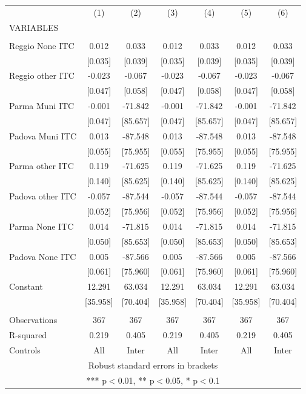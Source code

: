 \begin{tabular}{lcccccc} \hline
 & (1) & (2) & (3) & (4) & (5) & (6) \\
VARIABLES &  &  &  &  &  &  \\ \hline
 &  &  &  &  &  &  \\
Reggio None ITC & 0.012 & 0.033 & 0.012 & 0.033 & 0.012 & 0.033 \\
 & [0.035] & [0.039] & [0.035] & [0.039] & [0.035] & [0.039] \\
Reggio other ITC & -0.023 & -0.067 & -0.023 & -0.067 & -0.023 & -0.067 \\
 & [0.047] & [0.058] & [0.047] & [0.058] & [0.047] & [0.058] \\
Parma Muni ITC & -0.001 & -71.842 & -0.001 & -71.842 & -0.001 & -71.842 \\
 & [0.047] & [85.657] & [0.047] & [85.657] & [0.047] & [85.657] \\
Padova Muni ITC & 0.013 & -87.548 & 0.013 & -87.548 & 0.013 & -87.548 \\
 & [0.055] & [75.955] & [0.055] & [75.955] & [0.055] & [75.955] \\
Parma other ITC & 0.119 & -71.625 & 0.119 & -71.625 & 0.119 & -71.625 \\
 & [0.140] & [85.625] & [0.140] & [85.625] & [0.140] & [85.625] \\
Padova other ITC & -0.057 & -87.544 & -0.057 & -87.544 & -0.057 & -87.544 \\
 & [0.052] & [75.956] & [0.052] & [75.956] & [0.052] & [75.956] \\
Parma None ITC & 0.014 & -71.815 & 0.014 & -71.815 & 0.014 & -71.815 \\
 & [0.050] & [85.653] & [0.050] & [85.653] & [0.050] & [85.653] \\
Padova None ITC & 0.005 & -87.566 & 0.005 & -87.566 & 0.005 & -87.566 \\
 & [0.061] & [75.960] & [0.061] & [75.960] & [0.061] & [75.960] \\
Constant & 12.291 & 63.034 & 12.291 & 63.034 & 12.291 & 63.034 \\
 & [35.958] & [70.404] & [35.958] & [70.404] & [35.958] & [70.404] \\
 &  &  &  &  &  &  \\
Observations & 367 & 367 & 367 & 367 & 367 & 367 \\
R-squared & 0.219 & 0.405 & 0.219 & 0.405 & 0.219 & 0.405 \\
 Controls & All & Inter & All & Inter & All & Inter \\ \hline
\multicolumn{7}{c}{ Robust standard errors in brackets} \\
\multicolumn{7}{c}{ *** p$<$0.01, ** p$<$0.05, * p$<$0.1} \\
\end{tabular}
